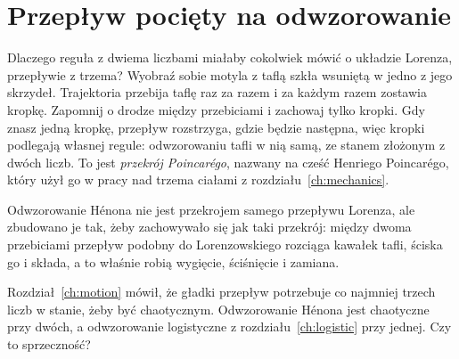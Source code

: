 \section{Przepływ pocięty na odwzorowanie}
\label{sec:ch10-section}

\noindent
Dlaczego reguła z dwiema liczbami miałaby cokolwiek mówić o układzie Lorenza,
przepływie z trzema? Wyobraź sobie motyla z taflą szkła wsuniętą w jedno z
jego skrzydeł. Trajektoria przebija taflę raz za razem i za każdym razem
zostawia kropkę. Zapomnij o drodze między przebiciami i zachowaj tylko
kropki. Gdy znasz jedną kropkę, przepływ rozstrzyga, gdzie będzie następna,
więc kropki podlegają własnej regule: odwzorowaniu tafli w nią samą, ze
stanem złożonym z dwóch liczb. To jest \emph{przekrój Poincarégo}, nazwany na
cześć Henriego Poincarégo, który użył go w pracy nad trzema ciałami z
rozdziału~\ref{ch:mechanics}.


\noindent
Odwzorowanie Hénona nie jest przekrojem samego przepływu Lorenza, ale
zbudowano je tak, żeby zachowywało się jak taki przekrój: między dwoma
przebiciami przepływ podobny do Lorenzowskiego rozciąga kawałek tafli, ściska
go i składa, a to właśnie robią wygięcie, ściśnięcie i zamiana.

\begin{think}
Rozdział~\ref{ch:motion} mówił, że gładki przepływ potrzebuje co najmniej
trzech liczb w stanie, żeby być chaotycznym. Odwzorowanie Hénona jest
chaotyczne przy dwóch, a odwzorowanie logistyczne z
rozdziału~\ref{ch:logistic} przy jednej. Czy to sprzeczność?
\end{think}

